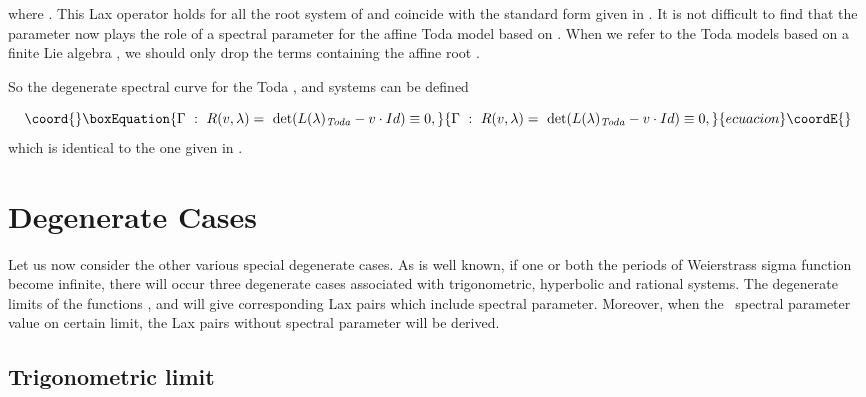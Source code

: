 \documentclass[a4paper,12pt]{article}
\begin{document}
where \coordHE{}.
This Lax operator holds for all the root system of
\coordHE{}  \coordHE{}  \coordHE{} and coincide with the standard
form given in \cite{op}. It is not difficult to find that
the parameter \coordHE{} now plays the role of a spectral parameter
for the affine Toda model based on \coordHE{}.
When we refer to the Toda models based on a finite Lie
algebra \coordHE{}, we should only drop the terms
containing the affine root \coordHE{}.

So the degenerate spectral curve for the  Toda \coordHE{}
, \coordHE{} and  \coordHE{} systems can be
defined

\begin{equation}\coord{}\boxEquation{
\Gamma \ :\ R(v,\lambda )=~\det (L(\lambda )_{\mathit{Toda}}-v\cdot
Id)\equiv 0,
}{
\Gamma \ :\ R(v,\lambda )=~\det (L(\lambda )_{\mathit{Toda}}-v\cdot
Id)\equiv 0,
}{ecuacion}\coordE{}\end{equation}
which is identical to the one given in \cite{Martin,Taka}.

\section{Degenerate Cases}

\setcounter{equation}{0} \label{degen} Let us now consider the other various
special degenerate cases. As is well known, if one or both
the periods of Weierstrass sigma function \coordHE{}
become infinite, there will occur three degenerate cases
associated with trigonometric, hyperbolic and rational
systems. The degenerate limits of the functions \coordHE{}, \coordHE{} and \coordHE{} will give corresponding Lax pairs which include
spectral parameter. Moreover, when the \ spectral parameter
value on certain limit, the Lax pairs without spectral
parameter will be derived.

\subsection{Trigonometric limit}
\end{document}
